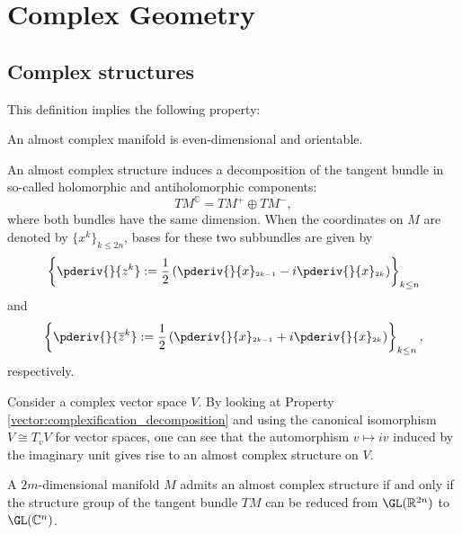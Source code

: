 \chapter{Complex Geometry}\label{chapter:complex_geometry}

\section{Complex structures}


    This definition implies the following property:
    \begin{property}
        An almost complex manifold is even-dimensional and orientable.
    \end{property}

    An almost complex structure induces a decomposition of the tangent bundle in so-called holomorphic and antiholomorphic components:\[TM^\mathbb{C} = TM^+\oplus TM^-,\] where both bundles have the same dimension. When the coordinates on $M$ are denoted by $\{x^k\}_{k\leq 2n}$, bases for these two subbundles are given by \[\left\{\pderiv{}{z^k} := \frac{1}{2}\left(\pderiv{}{x}_{^{2k-1}} - i\pderiv{}{x}_{^{2k}}\right)\right\}_{k\leq n}\] and \[\left\{\pderiv{}{\overline{z}^k} := \frac{1}{2}\left(\pderiv{}{x}_{^{2k-1}} + i\pderiv{}{x}_{^{2k}}\right)\right\}_{k\leq n},\] respectively.

    \begin{example}
        Consider a complex vector space $V$. By looking at Property \ref{vector:complexification_decomposition} and using the canonical isomorphism $V\cong T_vV$ for vector spaces, one can see that the automorphism $v\mapsto iv$ induced by the imaginary unit gives rise to an almost complex structure on $V$.
    \end{example}

    \begin{property}
        A $2m$-dimensional manifold $M$ admits an almost complex structure if and only if the structure group of the tangent bundle $TM$ can be reduced from $\GL(\mathbb{R}^{2n})$ to $\GL(\mathbb{C}^n)$.
    \end{property}

